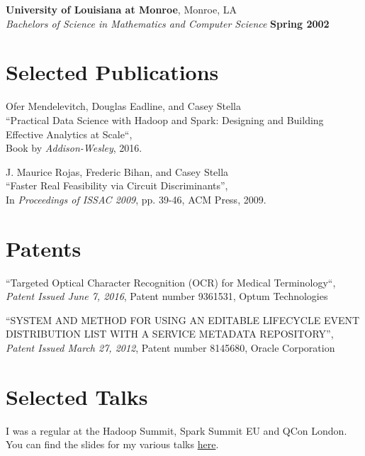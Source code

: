 \documentclass[margin,line,12pt]{resume}
\begin{document}
\begin{resume}
    \textbf{University of Louisiana at Monroe}, Monroe, LA \vspace{2mm}\\\vspace{1mm}%
    \textsl{Bachelors of Science in Mathematics and Computer Science} \hfill \textbf{ Spring 2002}\vspace{-3mm}\\\vspace{-1mm}%


    \section{\mysidestyle Selected Publications}

    Ofer Mendelevitch, Douglas Eadline, and Casey Stella\\
    ``Practical Data Science with Hadoop and Spark: Designing and Building Effective Analytics at Scale``,\\
    Book by \textsl{Addison-Wesley}, 2016.


    J. Maurice Rojas, Frederic Bihan, and Casey Stella\\
    ``Faster Real Feasibility via Circuit Discriminants'',\\
    In \textsl{Proceedings of ISSAC 2009}, pp. 39-46, ACM Press, 2009.


    \section{\mysidestyle Patents}

    ``Targeted Optical Character Recognition (OCR) for Medical Terminology``,\\
    \textsl{Patent Issued June 7, 2016}, Patent number 9361531, Optum Technologies

    ``SYSTEM AND METHOD FOR USING AN EDITABLE LIFECYCLE EVENT DISTRIBUTION LIST WITH A SERVICE METADATA REPOSITORY'',\\
    \textsl{Patent Issued March 27, 2012}, Patent number 8145680, Oracle Corporation


    \section{\mysidestyle Selected Talks}

    I was a regular at the Hadoop Summit, Spark Summit EU and QCon London. You can find
    the slides for my various talks \href{https://github.com/cestella/presentations}{here}.


\end{resume}
\end{document}
